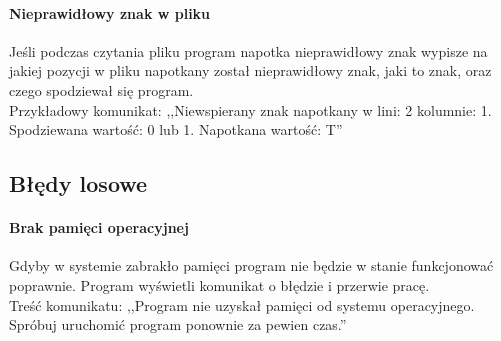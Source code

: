 \documentclass{report}
\begin{document}
 \paragraph{Nieprawidłowy znak w pliku}
 Jeśli podczas czytania pliku program napotka nieprawidłowy znak wypisze na jakiej pozycji w pliku napotkany został nieprawidłowy znak, jaki to znak, oraz czego spodziewał się program. \\
 Przykładowy komunikat: ,,Niewspierany znak napotkany w lini: 2 kolumnie: 1. Spodziewana wartość: 0 lub 1. Napotkana wartość: T''

\subsection{Błędy losowe}
\paragraph{Brak pamięci operacyjnej}
Gdyby w systemie zabrakło pamięci program nie będzie w stanie funkcjonować poprawnie. Program wyświetli komunikat o błędzie i przerwie pracę. \\
Treść komunikatu: ,,Program nie uzyskał pamięci od systemu operacyjnego. Spróbuj uruchomić program ponownie za pewien czas.''
\end{document}
